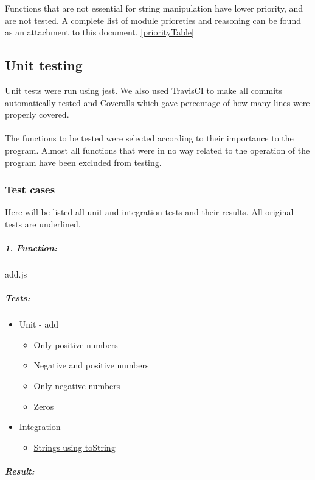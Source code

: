 \documentclass[a4paper, 12pt]{article}
\begin{document}
Functions that are not essential for string manipulation have lower priority, and are not tested.
A complete list of module prioreties and reasoning can be found as an attachment to this document. \ref{priorityTable}


    \subsection{Unit testing}
    Unit tests were run using jest. We also used TravisCI to make all commits automatically tested and Coveralls which gave percentage of how many lines were properly covered. 
    \\\\
    The functions to be tested were selected according to their importance to the program. Almost all functions that were in no way related to the operation of the program have been excluded from testing. 
    \newpage

        \subsubsection{Test cases}
		Here will be listed all unit and integration tests and their results.
		All original tests are underlined.

		\hypertarget{header-n5}{%
		\subparagraph{1. Function:}\label{header-n5}}

		add.js
		
		\hypertarget{header-n7}{%
		\subparagraph{Tests:}\label{header-n7}}
		
		\begin{itemize}
		\item
		Unit - add
		
		\begin{itemize}
			\item
			\underline{Only positive numbers}
			\item
			Negative and positive numbers
			\item
			Only negative numbers
			\item
			Zeros
		\end{itemize}
		\item
		Integration
		
		\begin{itemize}
			\item
			\underline{Strings using toString}
		\end{itemize}
		\end{itemize}
		
		\hypertarget{header-n25}{%
		\subparagraph{Result:}\label{header-n25}}
		
\end{document}
